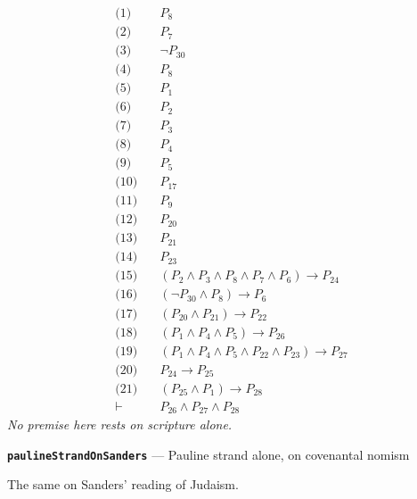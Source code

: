 \documentclass[11pt]{article}
\begin{document}
\begin{align*}
  \text{(1)} \quad & P_{8} \\
  \text{(2)} \quad & P_{7} \\
  \text{(3)} \quad & \lnot P_{30} \\
  \text{(4)} \quad & P_{8} \\
  \text{(5)} \quad & P_{1} \\
  \text{(6)} \quad & P_{2} \\
  \text{(7)} \quad & P_{3} \\
  \text{(8)} \quad & P_{4} \\
  \text{(9)} \quad & P_{5} \\
  \text{(10)} \quad & P_{17} \\
  \text{(11)} \quad & P_{9} \\
  \text{(12)} \quad & P_{20} \\
  \text{(13)} \quad & P_{21} \\
  \text{(14)} \quad & P_{23} \\
  \text{(15)} \quad & (P_{2} \land P_{3} \land P_{8} \land P_{7} \land P_{6}) \rightarrow P_{24} \\
  \text{(16)} \quad & (\lnot P_{30} \land P_{8}) \rightarrow P_{6} \\
  \text{(17)} \quad & (P_{20} \land P_{21}) \rightarrow P_{22} \\
  \text{(18)} \quad & (P_{1} \land P_{4} \land P_{5}) \rightarrow P_{26} \\
  \text{(19)} \quad & (P_{1} \land P_{4} \land P_{5} \land P_{22} \land P_{23}) \rightarrow P_{27} \\
  \text{(20)} \quad & P_{24} \rightarrow P_{25} \\
  \text{(21)} \quad & (P_{25} \land P_{1}) \rightarrow P_{28} \\
  \vdash \quad & P_{26} \land P_{27} \land P_{28}
\end{align*}
\emph{No premise here rests on scripture alone.}
\par\medskip\noindent\textbf{\texttt{pauline\allowbreak{}Strand\allowbreak{}On\allowbreak{}Sanders}} --- Pauline strand alone, on covenantal nomism\par\nobreak\noindent
The same on Sanders' reading of Judaism.
\end{document}
